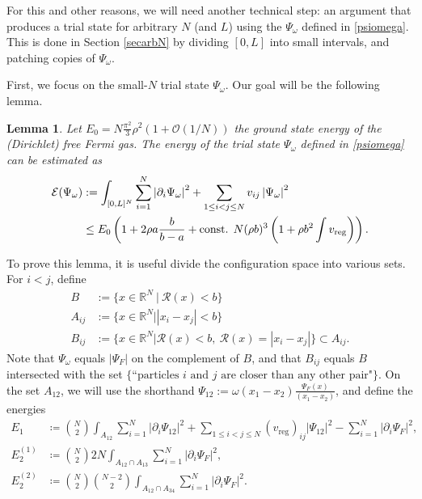 \documentclass[a4paper,11pt]{article}
\newcommand{\abs}[1]{\left\lvert #1 \right\rvert}
\newcommand{\R}{\mathbb{R}}
\newcommand{\rr}{\mathcal{R}}
\newtheorem{lemma}[theorem]{Lemma}
\numberwithin{equation}{section}
\begin{document}
For this and other reasons, we will need another technical step: an argument that produces a trial state for arbitrary $N$ (and $L$) using the $\Psi_\omega$ defined in \eqref{psiomega}. This is done in Section \ref{secarbN} by dividing $[0,L]$ into small intervals, and patching copies of $\Psi_\omega$. 

First, we focus on the small-$N$ trial state $\Psi_\omega$. Our goal will be the following lemma. 
	\begin{lemma}
	\label{LemmaUpperBoundFewParticles}
	Let $E_0=N\frac{\pi^2}{3}\rho^2(1+\mathcal{O}(1/N)) $ the ground state energy of the (Dirichlet) free Fermi gas. The energy of the trial state $\Psi_\omega$ defined in \eqref{psiomega} can be estimated as 
	    \begin{equation}
	    \begin{aligned}
	        \mathcal{E}(\Psi_\omega)&:=\int_{[0,L]^N} \sum_{i=1}^{N}\abs{\partial_i\Psi_\omega}^2+\sum_{1\leq i<j\leq N}v_{ij}\abs{\Psi_\omega}^2\\
	        &\leq E_0\left(1+2\rho a\frac{b}{b-a}+\textnormal{const. } N(\rho b)^3\left(1+\rho b^2\int v_\textnormal{reg}\right)\right).
	    \end{aligned}
	    \end{equation}
	\end{lemma}
To prove this lemma, it is useful divide the configuration space into various sets. For $i<j$, define 
\begin{equation}
\begin{aligned}
B&:=\{x\in\R^N\ \vert\ \mathcal{R}(x)<b \}\\
A_{ij}&:=\{x\in\R^N\vert \abs{x_i-x_j}<b\}\\
B_{ij}&:=\{x\in\R^N \vert \rr(x)<b,\ \rr(x)=\abs{x_i-x_j} \}\subset A_{ij}.
\end{aligned}
\end{equation}
Note that $ \Psi_\omega$ equals $\abs{\Psi_F} $ on the complement of $B$, and that $ B_{ij} $ equals $ B $ intersected with the set $ \{\text{``particles $i$ and $j$ are closer than any other pair"}\} $. On the set $A_{12}$, we will use the shorthand $\Psi_{12}:=\omega(x_1-x_2)\frac{\Psi_F(x)}{(x_1-x_2)}$, and define the energies
	\begin{equation}
	\begin{aligned}
	E_1&\coloneqq\binom{N}{2}\int_{A_{12}} \sum_{i=1}^{N}\abs{\partial_i\Psi_{12}}^2+\sum_{1\leq i<j\leq N}(v_{\text{reg}})_{ij}\abs{\Psi_{12}}^2-\sum_{i=1}^{N}\abs{\partial_i\Psi_F}^2, \\
	E_2^{(1)}&\coloneqq\binom{N}{2}2N\int_{A_{12}\cap A_{13}}\sum_{i=1}^{N}\abs{\partial_i\Psi_F}^2,\\ E_2^{(2)}&\coloneqq\binom{N}{2}\binom{N-2}{2}\int_{A_{12}\cap A_{34}}\sum_{i=1}^{N}\abs{\partial_i\Psi_F}^2.
	\end{aligned}
	\end{equation}
\end{document}
